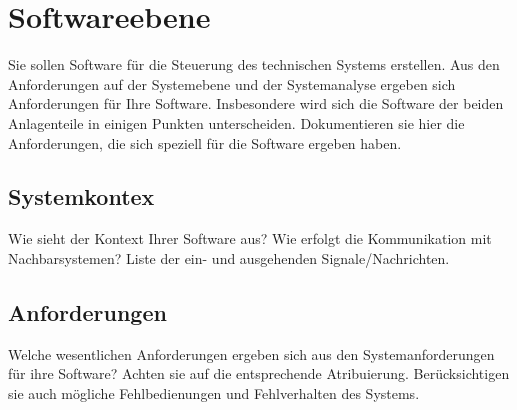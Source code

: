 \section{Softwareebene}

Sie sollen Software für die Steuerung des technischen Systems erstellen.
Aus den Anforderungen auf der Systemebene und der Systemanalyse ergeben
sich Anforderungen für Ihre Software. Insbesondere wird sich die
Software der beiden Anlagenteile in einigen Punkten unterscheiden.
Dokumentieren sie hier die Anforderungen, die sich speziell für die
Software ergeben haben.

\subsection{Systemkontex}

Wie sieht der Kontext Ihrer Software aus? Wie erfolgt die Kommunikation
mit Nachbarsystemen? Liste der ein- und ausgehenden Signale/Nachrichten.

\subsection{Anforderungen}

Welche wesentlichen Anforderungen ergeben sich aus den
Systemanforderungen für ihre Software? Achten sie auf die entsprechende
Atribuierung. Berücksichtigen sie auch mögliche Fehlbedienungen und
Fehlverhalten des Systems.
